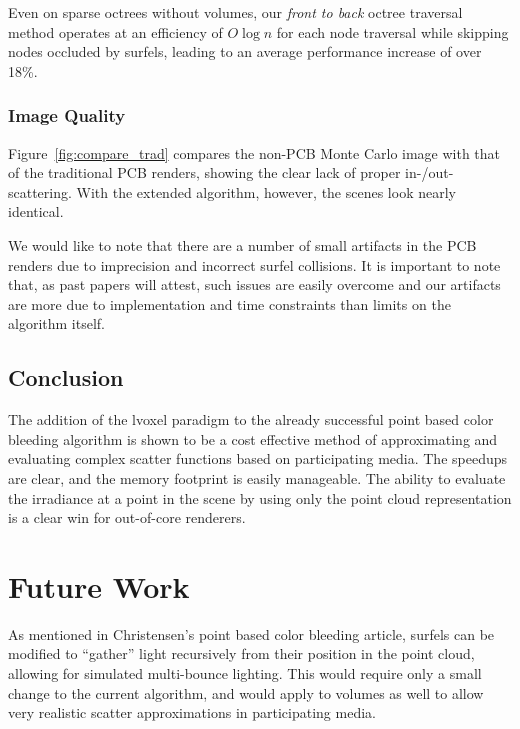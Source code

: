 \documentclass[runningheads]{llncs}
\begin{document}
Even on sparse octrees without volumes, our \textit{front to back} octree traversal method operates at an efficiency of $O\log{n}$ for each node traversal while skipping nodes occluded by surfels, leading to an average performance increase of over 18\%.

\subsubsection*{Image Quality}
Figure~\ref{fig:compare_trad} compares the non-PCB Monte Carlo image with that of the traditional PCB renders, showing the clear lack of proper in-/out-scattering.  With the extended algorithm, however, the scenes look nearly identical.

We would like to note that there are a number of small artifacts in the PCB renders due to imprecision and incorrect surfel collisions.  It is important to note that, as past papers will attest, such issues are easily overcome and our artifacts are more due to implementation and time constraints than limits on the algorithm itself.

\subsection{Conclusion}

The addition of the lvoxel paradigm to the already successful point based color bleeding algorithm is shown to be a cost effective method of approximating and evaluating complex scatter functions based on participating media.  The speedups are clear, and the memory footprint is easily manageable.  The ability to evaluate the irradiance at a point in the scene by using only the point cloud representation is a clear win for out-of-core renderers.

\section{Future Work}


As mentioned in Christensen's point based color bleeding article, surfels can be modified to ``gather'' light recursively from their position in the point cloud, allowing for simulated multi-bounce lighting.  This would require only a small change to the current algorithm, and would apply to volumes as well to allow very realistic scatter approximations in participating media.
\end{document}
